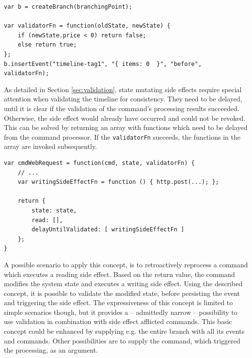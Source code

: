 \begin{lstlisting}[style=styled]
var b = createBranch(branchingPoint);

var validatorFn = function(oldState, newState) {
	if (newState.price < 0) return false;
	else return true;
};
b.insertEvent("timeline-tag1", "{ items: 0  }", "before", validatorFn);
\end{lstlisting}

As detailed in Section \ref{sec:validation}, state mutating side effects
require special attention when validating the timeline for consistency.
They need to be delayed, until it is clear if the validation of the command's
processing results succeeded.
Otherwise, the side effect would already have occurred and could not be
revoked. This can be solved by returning an array with functions which need
to be delayed from the command processor. If the \texttt{validatorFn} succeeds, 
the functions in the array are invoked subsequently.

\begin{lstlisting}[style=styled]
var cmdWebRequest = function(cmd, state, validatorFn) {
	// ...
	var writingSideEffectFn = function () { http.post(...); };

	return {
		state: state,
		read: [],
		delayUntilValidated: [ writingSideEffectFn ]
	};
}
\end{lstlisting}

A possible scenario to apply this concept, is to retroactively reprocess a 
command which executes a reading side effect. Based on the return value, the 
command modifies the system state and executes a writing side effect. Using 
the described concept, it is possible to validate the modified state, before 
persisting the event and triggering the side effect.
%
The expressiveness of this concept is limited to simple scenarios though, but 
it provides a -- admittedly narrow -- possibility to use validation in 
combination with side effect afflicted commands.
This basic concept could be enhanced by supplying e.g. the entire branch
with all its events and commands. Other possibilities are to supply the 
command, which triggered the processing, as an argument.


